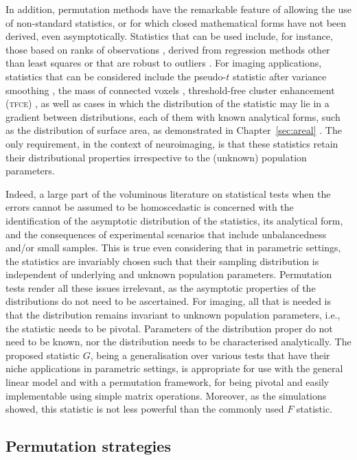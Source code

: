 In addition, permutation methods have the remarkable feature of allowing the use of non-standard statistics, or for which closed mathematical forms have not been derived, even asymptotically. Statistics that can be used include, for instance, those based on ranks of observations \citep{Brunner2000, Rorden2007}, derived from regression methods other than least squares \citep{Cade1996} or that are robust to outliers \citep{Theil1950, Sen1968}. For imaging applications, statistics that can be considered include the pseudo-$t$ statistic after variance smoothing \citep{Holmes1996}, the mass of connected voxels \citep{Bullmore1999}, threshold-free cluster enhancement (\textsc{tfce}) \citep{Smith2009}, as well as cases in which the distribution of the statistic may lie in a gradient between distributions, each of them with known analytical forms, such as the distribution of surface area, as demonstrated in Chapter~\ref{sec:areal} \citep[published as][]{Winkler2012}. The only requirement, in the context of neuroimaging, is that these statistics retain their distributional properties irrespective to the (unknown) population parameters.

Indeed, a large part of the voluminous literature on statistical tests when the errors cannot be assumed to be homoscedastic is concerned with the identification of the asymptotic distribution of the statistics, its analytical form, and the consequences of experimental scenarios that include unbalancedness and/or small samples. This is true even considering that in parametric settings, the statistics are invariably chosen such that their sampling distribution is independent of underlying and unknown population parameters. Permutation tests render all these issues irrelevant, as the asymptotic properties of the distributions do not need to be ascertained. For imaging, all that is needed is that the distribution remains invariant to unknown population parameters, i.e., the statistic needs to be pivotal. Parameters of the distribution proper do not need to be known, nor the distribution needs to be characterised analytically. The proposed statistic $G$, being a generalisation over various tests that have their niche applications in parametric settings, is appropriate for use with the general linear model and with a permutation framework, for being pivotal and easily implementable using simple matrix operations. Moreover, as the simulations showed, this statistic is not less powerful than the commonly used $F$ statistic.

\subsection{Permutation strategies}

